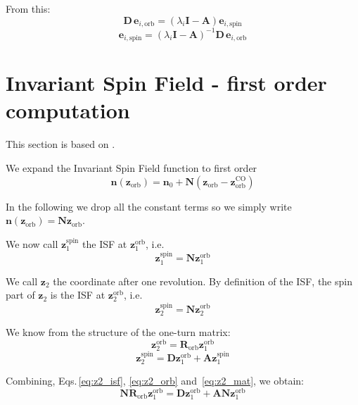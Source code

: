 From this:
\begin{equation}
\mathbf{D} \, \bm{e}_{i, \text{orb}}  = \left(\lambda_i \bm{I} - \mathbf{A} \right) \bm{e}_{i, \text{spin}}
\end{equation}
\begin{equation}
\bm{e}_{i, \text{spin}} = \left(\lambda_i \bm{I} - \mathbf{A} \right)^{-1}\mathbf{D} \, \bm{e}_{i, \text{orb}} 
\end{equation}

\section{Invariant Spin Field - first order computation}

This section is based on \cite{Chao:1980fz}.

We expand the Invariant Spin Field \cite{hoffstaetter2006high} function to first order
\begin{equation}
\bm{n}(\bm{z}_{\text{orb}}) = \bm{n}_0
+ \mathbf{N} \left(\bm{z}_{\text{orb}} - \bm{z}_{\text{orb}}^\text{CO} \right)
\end{equation}

In the following we drop all the constant terms so we simply write
$\bm{n}(\bm{z}_{\text{orb}}) = \mathbf{N} \bm{z}_{\text{orb}}$.

We now call $\bm{z}_1^{\text{spin}}$ the ISF at $\bm{z}_1^{\text{orb}}$, i.e.
\begin{equation}
\bm{z}_1^{\text{spin}} = \mathbf{N} \bm{z}_1^{\text{orb}}
\end{equation}

We call $\bm{z}_2$ the coordinate after one revolution. By definition of the ISF, the spin part of $\bm{z}_2$ is the ISF at $\bm{z}_2^{\text{orb}}$, i.e.
\begin{equation}
\bm{z}_2^{\text{spin}} = \mathbf{N} \bm{z}_2^{\text{orb}}
\label{eq:z2_isf}
\end{equation}

We know from the structure of the one-turn matrix:
\begin{equation}
\bm{z}_2^{\text{orb}}  = \mathbf{R}_{\text{orb}} \bm{z}_1^{\text{orb}}
\label{eq:z2_orb}
\end{equation}
\begin{equation}
\bm{z}_2^{\text{spin}} = \mathbf{D} \bm{z}_1^{\text{orb}} + \mathbf{A} \bm{z}_1^{\text{spin}}
\label{eq:z2_mat}
\end{equation}

Combining, Eqs.\,\ref{eq:z2_isf}, \ref{eq:z2_orb} and~\ref{eq:z2_mat}, we obtain:
\begin{equation}
\mathbf{N} \mathbf{R}_{\text{orb}} \bm{z}_1^{\text{orb}} = \mathbf{D} \bm{z}_1^{\text{orb}} + \mathbf{A} \mathbf{N} \bm{z}_1^{\text{orb}}
\end{equation}

